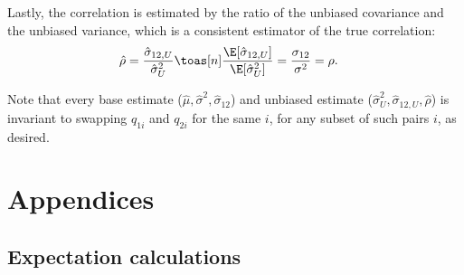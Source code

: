 \documentclass[11pt]{article}
\begin{document}
Lastly, the correlation is estimated by the ratio of the unbiased covariance and the unbiased variance, which is a consistent estimator of the true correlation:
\begin{align*}
  \hat{\rho}
  &=
    \frac{ \hat{\sigma}_{12,U} }{ \hat{\sigma}^2_U }
    \toas[n]
    \frac{ \E[ \hat{\sigma}_{12,U} ] }{ \E [ \hat{\sigma}^2_U ] }
    =
    \frac{ \sigma_{12} }{ \sigma^2 }
    =
    \rho
    .    
\end{align*}

Note that every base estimate ($\hat{\mu}, \hat{\sigma}^2, \hat{\sigma}_{12}$) and unbiased estimate ($\hat{\sigma}^2_U, \hat{\sigma}_{12,U},\hat{\rho}$) is invariant to swapping $q_{1i}$ and $q_{2i}$ for the same $i$, for any subset of such pairs $i$, as desired.

\section{Appendices}

\subsection{Expectation calculations}

\label{sec:expectations}
\end{document}
